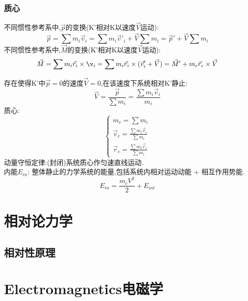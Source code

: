 \documentclass{article}
\begin{document}
\subsubsection{质心}
不同惯性参考系中,$\vec p$的变换(K'相对K以速度$\vec V$运动):
\[\vec p = \sum m_{i} \vec v_{i} = \sum m_{i} \vec v'_{i} + \vec V \sum m_{i}
 = \vec p' + \vec V \sum m_{i}\]
不同惯性参考系中,$\vec M$的变换(K'相对K以速度$\vec V$运动):
\[\vec M = \sum m_{i} \vec r_{i} \times \v_{i} = \sum m_{i} \vec r_{i} \times (\vec v'_{i} + \vec V) = \vec M' + m_{c} \vec r_{c} \times \vec V\]

存在使得K'中$\vec p = 0$的速度$\vec V = 0$,在该速度下系统相对K'静止:
\[\vec V = \frac{\vec p}{\sum m_{i}} = \frac{\sum m_{i} \vec v_{i}}{m_{i}}\]
质心: 
\begin{displaymath}
    \left\{ \begin{array}{ll}
    m_{c} = \sum m_{i}\\
    \vec v_{c} = \frac{\sum m_{i} \vec v_{i}}{\sum m_{i}}\\
    \vec r_{c} = \frac{\sum m_{i} \vec r_{i}}{\sum m_{i}}
    \end{array} \right.
\end{displaymath}
动量守恒定律:(封闭)系统质心作匀速直线运动.\\
内能$E_{in}$: 整体静止的力学系统的能量,包括系统内相对运动动能 + 相互作用势能.
\[E_{in} = \frac{m_{c} V^2}{2} + E_{int}\]


\section{相对论力学}

\subsection{相对性原理}




\section{Electromagnetics电磁学}
\end{document}
